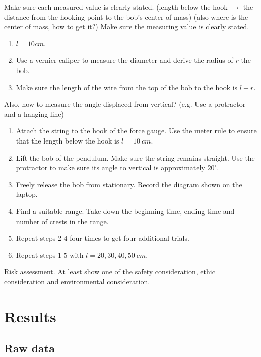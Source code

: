\documentclass[a4paper]{article}
\begin{document}
\begin{tcolorbox}[title = Note]
    Make sure each measured value is clearly stated. (length below the hook  $\rightarrow$ the distance from the hooking point to the bob's center of mass)
    (also where is the center of mass, how to get it?)
    Make sure the measuring value is clearly stated.
    \begin{enumerate}
        \item $l = 10cm$.
        \item Use a vernier caliper to measure the diameter and derive the radius of $r$ the bob.
        \item Make sure the length of the wire from the top of the bob to the hook is $l - r$.
    \end{enumerate}
    Also, how to measure the angle displaced from vertical? (e.g. Use a protractor and a hanging line)
\end{tcolorbox}

\begin{enumerate}
    \item Attach the string to the hook of the force gauge. Use the meter rule to ensure that the length below the hook is $l = \SI{10}{cm}$.
    \item Lift the bob of the pendulum. Make sure the string remains straight. Use the protractor to make sure its angle to vertical is approximately $20^\circ$.
    \item Freely release the bob from stationary. Record the diagram shown on the laptop.
    \item Find a suitable range. Take down the beginning time, ending time and number of crests in the range. 
    \item Repeat steps 2-4 four times to get four additional trials.
    \item Repeat steps 1-5 with $l = 20, 30, 40, 50 \SI{}{cm}$.
\end{enumerate}

\begin{tcolorbox}[title = Note]
    Risk assessment.
    At least show one of the safety consideration, ethic consideration and environmental consideration. 
\end{tcolorbox}

\section{Results}

\subsection{Raw data}
\end{document}
